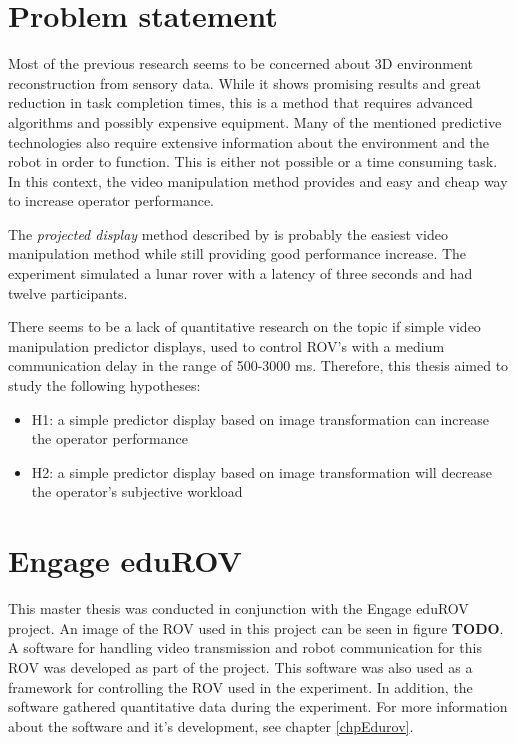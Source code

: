 \section{Problem statement}

Most of the previous research seems to be concerned about 3D environment reconstruction from sensory data. While it shows promising results and great reduction in task completion times, this is a method that requires advanced algorithms and possibly expensive equipment. Many of the mentioned predictive technologies also require extensive information about the environment and the robot in order to function. This is either not possible or a time consuming task. In this context, the video manipulation method provides and easy and cheap way to increase operator performance.

The \textit{projected display} method described by \citep{Matheson2013} is probably the easiest video manipulation method while still providing good performance increase. The experiment simulated a lunar rover with a latency of three seconds and had twelve participants.

There seems to be a lack of quantitative research on the topic if simple video manipulation predictor displays, used to control ROV's with a medium communication delay in the range of 500-3000 ms. Therefore, this thesis aimed to study the following hypotheses:

\begin{itemize}
\item H1: a simple predictor display based on image transformation can 
 increase the operator performance
 \item H2: a simple predictor display based on image transformation will decrease the operator's subjective workload
\end{itemize}

\section{Engage eduROV}

This master thesis was conducted in conjunction with the Engage eduROV project. An image of the ROV used in this project can be seen in figure \textbf{TODO}. A software for handling video transmission and robot communication for this ROV was developed as part of the project. This software was also used as a framework for controlling the ROV used in the experiment. In addition, the software gathered quantitative data during the experiment. For more information about the software and it's development, see chapter \ref{chpEdurov}.

